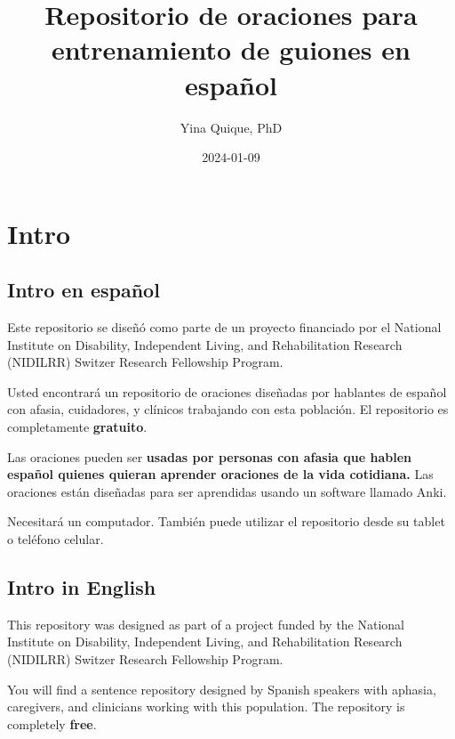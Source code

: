 \documentclass[
]{book}
\title{Repositorio de oraciones para entrenamiento de guiones en español}
\author{Yina Quique, PhD}
\date{2024-01-09}
\begin{document}
\maketitle

{
\setcounter{tocdepth}{1}
\tableofcontents
}
\hypertarget{intro}{%
\chapter*{Intro}\label{intro}}

\hypertarget{intro-en-espauxf1ol}{%
\section*{\texorpdfstring{Intro en \textbf{español}}{Intro en español}}\label{intro-en-espauxf1ol}}

Este repositorio se diseñó como parte de un proyecto financiado por el National Institute on Disability, Independent Living, and Rehabilitation Research (NIDILRR) Switzer Research Fellowship Program.

Usted encontrará un repositorio de oraciones diseñadas por hablantes de español con afasia, cuidadores, y clínicos trabajando con esta población. El repositorio es completamente \textbf{gratuito}.

Las oraciones pueden ser \textbf{usadas por personas con afasia que hablen español quienes quieran aprender oraciones de la vida cotidiana.} Las oraciones están diseñadas para ser aprendidas usando un software llamado Anki.

Necesitará un computador. También puede utilizar el repositorio desde su tablet o teléfono celular.

\hypertarget{intro-in-english}{%
\section*{\texorpdfstring{Intro in \textbf{English}}{Intro in English}}\label{intro-in-english}}

This repository was designed as part of a project funded by the National Institute on Disability, Independent Living, and Rehabilitation Research (NIDILRR) Switzer Research Fellowship Program.

You will find a sentence repository designed by Spanish speakers with aphasia, caregivers, and clinicians working with this population. The repository is completely \textbf{free}.
\end{document}
